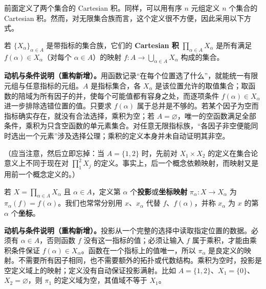 \documentclass[../../main.tex]{subfiles}%
\begin{document}
前面定义了两个集合的 Cartesian 积。同样，可以用有序 $n$ 元组定义 $n$ 个集合的 Cartesian 积。然而，对无限集合族而言，这个定义很不方便，因此采用以下方式。
\begin{definition}\label{definition:ch00-arbitrary-cartesian-product}
若 $\{X_\alpha\}_{\alpha\in A}$ 是带指标的集合族，它们的 \textbf{Cartesian 积} $\prod\limits_{\alpha\in A}X_\alpha$ 是所有满足 $f(\alpha)\in X_\alpha$（对每个 $\alpha\in A$）的映射 $f:A\to\bigcup_{\alpha\in A}X_\alpha$ 构成的集合。
\end{definition}
\begin{remark}
\textbf{动机与条件说明（重构新增）。}用函数记录“在每个位置选了什么”，就能统一有限元组与任意指标的元组。$A$ 是指标集合，各 $X_\alpha$ 是该位置允许的取值集合；取函数的陪域为所有因子的并，使每个可能值都有容身之处，而逐项条件 $f(\alpha)\in X_\alpha$ 进一步排除选错位置的值。只要求 $f(\alpha)$ 属于总并是不够的。若某个因子为空而指标确实存在，就没有合法选择，乘积为空；若 $A=\varnothing$，唯一的空函数满足全部条件，乘积为只含空函数的单元素集合。对任意无限指标族，“各因子非空便能同时选出一个元素”涉及选择公理；乘积的定义本身并未自动证明其非空。
\end{remark}


\begin{remark}
（应当注意，然后立即忘掉：当 $A=\{1,2\}$ 时，先前对 $X_1\times X_2$ 的定义在集合论意义上不同于现在对 $\prod\limits_1^2X_j$ 的定义。事实上，后一个概念依赖映射，而映射又是用前一个概念定义的。）
\end{remark}

\begin{definition}[投影与坐标]\label{definition:ch00-projection-coordinate}
若 $X=\prod\limits_{\alpha\in A}X_\alpha$ 且 $\alpha\in A$，定义第 $\alpha$ 个\textbf{投影}或\textbf{坐标映射} $\pi_\alpha:X\to X_\alpha$ 为 $\pi_\alpha(f)=f(\alpha)$。我们也常常分别用 $x$、$x_\alpha$ 代替 $f$、$f(\alpha)$，并称 $x_\alpha$ 为 $x$ 的第 $\alpha$ 个\textbf{坐标}。
\end{definition}
\begin{remark}
\textbf{动机与条件说明（重构新增）。}投影从一个完整的选择中读取指定位置的数据。必须有 $\alpha\in A$，否则函数 $f$ 没有这一指标的值；必须让输入 $f$ 属于乘积，才能由乘积条件保证 $f(\alpha)\in X_\alpha$。函数在一个指标上的值唯一，所以 $\pi_\alpha$ 是良定义的映射。不需要所有因子相同，也不需要额外的拓扑或代数结构。乘积为空时，投影是空定义域上的映射；定义没有自动保证投影满射。比如 $A=\{1,2\}$、$X_1=\{0\}$、$X_2=\varnothing$，则 $\pi_1$ 的定义域为空，其值域不等于 $X_1$。
\end{remark}
\end{document}

